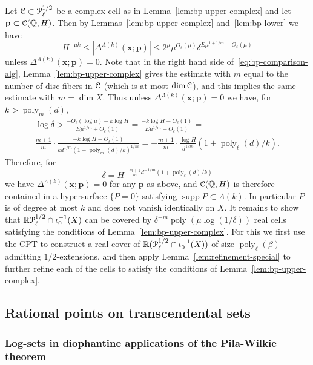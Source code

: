 \documentclass[reqno]{amsart}
\renewcommand\~[1]{\widetilde{#1}}
\def\poly{\operatorname{poly}} \def\J{\operatorname{J}}
\def\cP{{\mathcal P}} \def\cR{{\mathcal R}}
\def\supp{\operatorname{supp}}
\def\vx{{\mathbf x}}
\def\vp{{\mathbf p}}
\begin{document}
Let $\cC\subset\cP_\ell^{1/2}$ be a complex cell as in
Lemma~\ref{lem:bp-upper-complex} and let $\vp\subset\cC(\Q,H)$. Then
by Lemmas~\ref{lem:bp-upper-complex} and~\ref{lem:bp-lower} we have
\begin{equation}\label{eq:bp-comparison-alg}
  H^{-\mu k} \le |\Delta^{\Lambda(k)}(\vx;\vp)| \le 2^\mu \mu^{O_\ell(\mu)} \delta^{E\mu^{1+1/m}+O_\ell(\mu)}
\end{equation}
unless $\Delta^{\Lambda(k)}(\vx;\vp)=0$. Note that in the right hand
side of~\eqref{eq:bp-comparison-alg}, Lemma~\ref{lem:bp-upper-complex}
gives the estimate with $m$ equal to the number of disc fibers in
${\mathcal C}$ (which is at most $\dim{\mathcal C}$), and this implies the same estimate
with $m=\dim X$. Thus unless $\Delta^{\Lambda(k)}(\vx;\vp)=0$ we have,
for $k>\poly_m(d)$,
\begin{multline}
  \log\delta >
  \frac{- O_\ell(\log\mu) - k\log H }{E\mu^{1/m}+O_\ell(1)} =
  \frac{-k\log H - O_\ell(1)}{E\mu^{1/m}+O_\ell(1)} = \\
  \frac{m+1}{m} \cdot\frac{-k\log H-O_\ell(1)}{kd^{1/m} (1+\poly_m(d)/k)^{1/m}} =
  -\frac{m+1}{m}\cdot\frac{\log H}{d^{1/m}} (1+\poly_\ell(d)/k).
\end{multline}
Therefore, for
\begin{equation}
  \delta = H^{-\frac{m+1}m d^{-1/m}(1+\poly_\ell(d)/k)}
\end{equation}
we have $\Delta^{\Lambda(k)}(\vx;\vp)=0$ for any $\vp$ as above, and
${\mathcal C}({\mathbb Q},H)$ is therefore contained in a hypersurface $\{P=0\}$
satisfying $\supp P\subset\Lambda(k)$. In particular $P$ is of degree
at most $k$ and does not vanish identically on $X$. It remains to show
that $\R\cP_\ell^{1/2}\cap\iota_0^{-1}(X)$ can be covered by
$\delta^{-m}\poly(\mu\log(1/\delta))$ real cells satisfying the conditions
of Lemma~\ref{lem:bp-upper-complex}. For this we first use the CPT to
construct a real cover of $\R(\cP_\ell^{1/2}\cap\iota_0^{-1}(X))$ of
size $\poly_\ell(\beta)$ admitting $1/2$-extensions, and then apply
Lemma~\ref{lem:refinement-special} to further refine each of the cells
to satisfy the conditions of Lemma~\ref{lem:bp-upper-complex}.

\subsection{Rational points on transcendental sets}
\label{sec:trans-density}

\subsubsection{Log-sets in diophantine applications of the Pila-Wilkie
theorem}
\label{sec:log-sets-pila}
\end{document}
